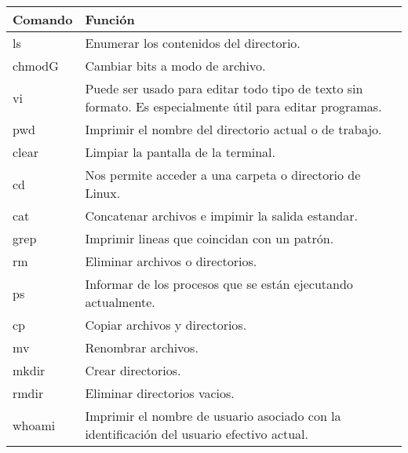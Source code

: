 \documentclass[12pt]{article}
\begin{document}
    \begin{tabular}{
			|p{5cm}|p{9cm}||}
		
			\hline
			\textbf{ Comando} & \textbf{  Función}\\ 
			\hline
			\hline ls & Enumerar los contenidos del directorio.\\
			\hline chmodG& Cambiar bits a modo de archivo.\\
			\hline vi & Puede ser usado para editar todo tipo de texto sin formato. Es especialmente útil para editar programas.\\
			\hline pwd & Imprimir el nombre del directorio actual o de trabajo.\\
			\hline clear & Limpiar la pantalla de la terminal. \\
			\hline  cd & Nos permite acceder a una carpeta o directorio de Linux.\\
			\hline cat & Concatenar archivos e impimir la salida estandar.\\
			\hline grep & Imprimir lineas que coincidan con un patrón.\\
			\hline rm & Eliminar archivos o directorios.\\
			\hline ps & Informar de los procesos que se están ejecutando actualmente.\\
			\hline cp & Copiar archivos y directorios.\\
			\hline mv & Renombrar archivos.\\
			\hline mkdir & Crear directorios.\\
			\hline rmdir & Eliminar directorios vacios.\\
			\hline whoami & Imprimir el nombre de usuario asociado con la identificación del usuario efectivo actual.\\
			\hline
			\end{tabular}\
\newpage
\end{document}
